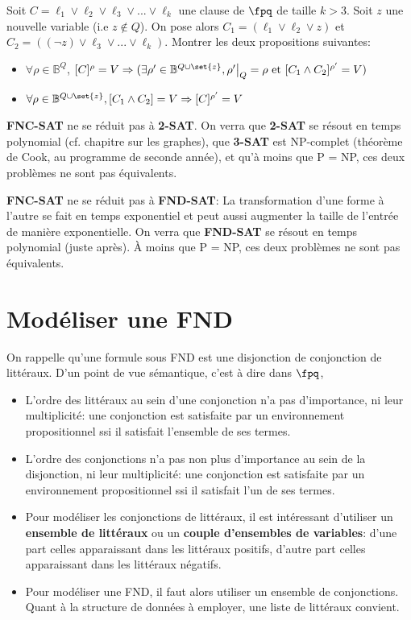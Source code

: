 \documentclass{scrartcl}
\begin{document}
		\exo Soit $C = \ell_1 \vee \ell_2 \vee \ell_3 \vee ... \vee \ell_k$ une clause de $\fpq$ de taille $k > 3$.
		Soit $z$ une nouvelle variable (i.e $z \not\in Q$). 
		On pose alors $C_1 = (\ell_1 \vee \ell_2 \vee z)$ et $C_2 = ((\neg z) \vee \ell_3 \vee ... \vee \ell_k)$.
		Montrer les deux propositions suivantes:
		\begin{itemize}
			\item $\forall \rho \in \mathbb{B}^Q$, $[C]^\rho = V \Rightarrow 
				(\exists \rho' \in \mathbb{B}^{Q\cup\set{z}}, \rho'\big|_Q = \rho \text{ et } [C_1\wedge C_2]^{\rho'} = V)$
			\item $\forall \rho \in \mathbb{B}^{Q\cup\set{z}}, [C_1\wedge C_2] = V \Rightarrow [C]^{\rho'} = V$
		\end{itemize}

		\rem \textbf{FNC-SAT} ne se réduit pas à \textbf{2-SAT}. 
		On verra que \textbf{2-SAT} se résout en temps polynomial (cf. chapitre sur les graphes), 
		que \textbf{3-SAT} est NP-complet (théorème de Cook, au programme de seconde année),
		et qu'à moins que P = NP, ces deux problèmes ne sont pas équivalents.

		\rem \textbf{FNC-SAT} ne se réduit pas à \textbf{FND-SAT}:
		La transformation d'une forme à l'autre se fait en temps exponentiel et peut aussi augmenter la taille de l'entrée de manière exponentielle.
		On verra que \textbf{FND-SAT} se résout en temps polynomial (juste après).
		À moins que P = NP, ces deux problèmes ne sont pas équivalents.

	\section{Modéliser une FND}
		On rappelle qu'une formule sous FND est une disjonction de conjonction de littéraux. D'un point de vue sémantique, c'est à dire dans $\fpq$,
		\begin{itemize}
			\item L'ordre des littéraux au sein d'une conjonction n'a pas d'importance, ni leur multiplicité:
				une conjonction est satisfaite par un environnement propositionnel ssi il satisfait l’ensemble de ses termes.
			\item L'ordre des conjonctions n'a pas non plus d'importance au sein de la disjonction, ni leur multiplicité:
				une conjonction est satisfaite par un environnement propositionnel ssi il satisfait l'un de ses termes.
			\item Pour modéliser les conjonctions de littéraux, il est intéressant d'utiliser un \textbf{ensemble de littéraux} ou un \textbf{couple d'ensembles de variables}:
				d'une part celles apparaissant dans les littéraux positifs, d'autre part celles apparaissant dans les littéraux négatifs.
			\item Pour modéliser une FND, il faut alors utiliser un ensemble de conjonctions. 
				Quant à la structure de données à employer, une liste de littéraux convient.
		\end{itemize}
	
\end{document}
